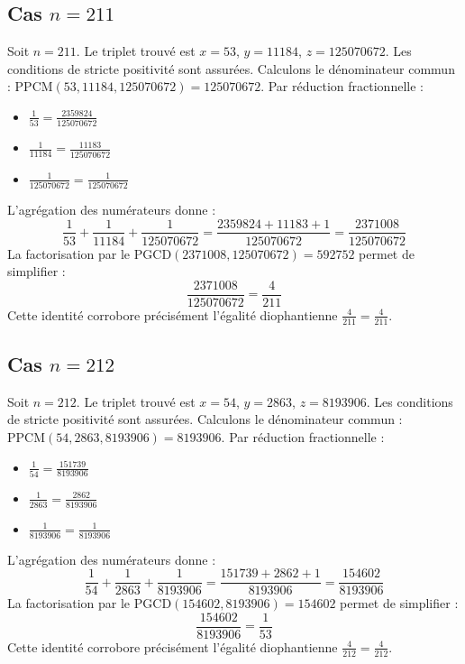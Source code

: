 \documentclass[11pt,a4paper]{article}
\begin{document}
\subsection{Cas $n = 211$}
Soit $n = 211$. Le triplet trouvé est $x = 53$, $y = 11184$, $z = 125070672$.
Les conditions de stricte positivité sont assurées.
Calculons le dénominateur commun : $\text{PPCM}(53, 11184, 125070672) = 125070672$.
Par réduction fractionnelle :
\begin{itemize}
    \item $\frac{1}{53} = \frac{2359824}{125070672}$
    \item $\frac{1}{11184} = \frac{11183}{125070672}$
    \item $\frac{1}{125070672} = \frac{1}{125070672}$
\end{itemize}
L'agrégation des numérateurs donne :
$$ \frac{1}{53} + \frac{1}{11184} + \frac{1}{125070672} = \frac{2359824 + 11183 + 1}{125070672} = \frac{2371008}{125070672} $$
La factorisation par le $\text{PGCD}(2371008, 125070672) = 592752$ permet de simplifier :
$$ \frac{2371008}{125070672} = \frac{4}{211} $$
Cette identité corrobore précisément l'égalité diophantienne $\frac{4}{211} = \frac{4}{211}$.

\subsection{Cas $n = 212$}
Soit $n = 212$. Le triplet trouvé est $x = 54$, $y = 2863$, $z = 8193906$.
Les conditions de stricte positivité sont assurées.
Calculons le dénominateur commun : $\text{PPCM}(54, 2863, 8193906) = 8193906$.
Par réduction fractionnelle :
\begin{itemize}
    \item $\frac{1}{54} = \frac{151739}{8193906}$
    \item $\frac{1}{2863} = \frac{2862}{8193906}$
    \item $\frac{1}{8193906} = \frac{1}{8193906}$
\end{itemize}
L'agrégation des numérateurs donne :
$$ \frac{1}{54} + \frac{1}{2863} + \frac{1}{8193906} = \frac{151739 + 2862 + 1}{8193906} = \frac{154602}{8193906} $$
La factorisation par le $\text{PGCD}(154602, 8193906) = 154602$ permet de simplifier :
$$ \frac{154602}{8193906} = \frac{1}{53} $$
Cette identité corrobore précisément l'égalité diophantienne $\frac{4}{212} = \frac{4}{212}$.
\end{document}
